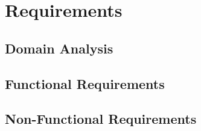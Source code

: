 \chapter{Requirements}
\noindent

\section{Domain Analysis}

\section{Functional Requirements}

\section{Non-Functional Requirements}